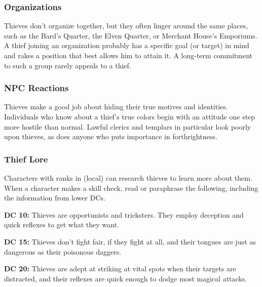 \subsubsection{Organizations}
Thieves don't organize together, but they often linger around the same places, such as the Bard's Quarter, the Elven Quarter, or Merchant House's Emporiums. A thief joining an organization probably has a specific goal (or target) in mind and rakes a position that best allows him to attain it. A long-term commitment to such a group rarely appeals to a thief.

\subsubsection{NPC Reactions}
Thieves make a good job about hiding their true motives and identities. Individuals who know about a thief's true colors begin with an attitude one step more hostile than normal. Lawful clerics and templars in particular look poorly upon thieves, as does anyone who puts importance in forthrightness.

\subsubsection{Thief Lore}
Characters with ranks in  (local) can research thieves to learn more about them. When a character makes a skill check, read or paraphrase the following, including the information from lower DCs.

\textbf{DC 10:} Thieves are opportunists and tricksters. They employ deception and quick reflexes to get what they want.

\textbf{DC 15:} Thieves don't fight fair, if they fight at all, and their tongues are just as dangerous as their poisonous daggers.

\textbf{DC 20:} Thieves are adept at striking at vital spots when their targets are distracted, and their reflexes are quick enough to dodge most magical attacks.